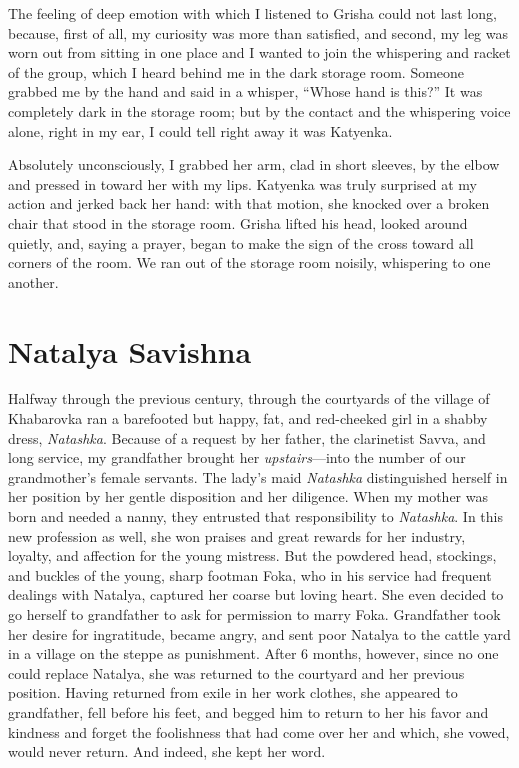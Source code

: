 The feeling of deep emotion with which I listened to Grisha could not last long, because, first of all, my curiosity was more than satisfied, and second, my leg was worn out from sitting in one place and I wanted to join the whispering and racket of the group, which I heard behind me in the dark storage room. Someone grabbed me by the hand and said in a whisper, ``Whose hand is this?'' It was completely dark in the storage room; but by the contact and the whispering voice alone, right in my ear, I could tell right away it was Katyenka.

Absolutely unconsciously, I grabbed her arm, clad in short sleeves, by the elbow and pressed in toward her with my lips. Katyenka was truly surprised at my action and jerked back her hand: with that motion, she knocked over a broken chair that stood in the storage room. Grisha lifted his head, looked around quietly, and, saying a prayer, began to make the sign of the cross toward all corners of the room. We ran out of the storage room noisily, whispering to one another.

\chapter{Natalya Savishna} %

Halfway through the previous century, through the courtyards of the village of Khabarovka ran a barefooted but happy, fat, and red-cheeked girl in a shabby dress, \textit{Natashka}. Because of a request by her father, the clarinetist Savva, and long service, my grandfather brought her \emph{upstairs}---into the number of our grandmother's female servants. The lady's maid \textit{Natashka} distinguished herself in her position by her gentle disposition and her diligence. When my mother was born and needed a nanny, they entrusted that responsibility to \textit{Natashka}. In this new profession as well, she won praises and great rewards for her industry, loyalty, and affection for the young mistress. But the powdered head, stockings, and buckles of the young, sharp footman Foka, who in his service had frequent dealings with Natalya, captured her coarse but loving heart. She even decided to go herself to grandfather to ask for permission to marry Foka. Grandfather took her desire for ingratitude, became angry, and sent poor Natalya to the cattle yard in a village on the steppe as punishment. After 6 months, however, since no one could replace Natalya, she was returned to the courtyard and her previous position. Having returned from exile in her work clothes, she appeared to grandfather, fell before his feet, and begged him to return to her his favor and kindness and forget the foolishness that had come over her and which, she vowed, would never return. And indeed, she kept her word.

